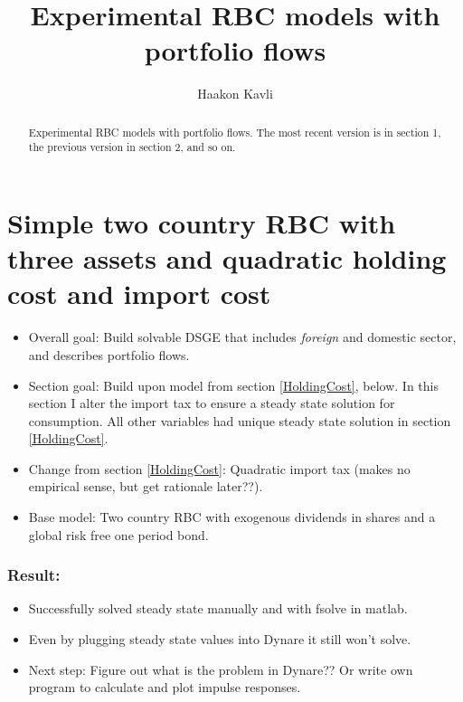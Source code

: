 \documentclass[a4paper]{article}
\begin{document}
\title{Experimental RBC models with portfolio flows}
\author{Haakon Kavli}
\maketitle
\begin{abstract}
Experimental RBC models with portfolio flows. The most recent version is in section 1, the previous version in section 2, and so on. 
\end{abstract}



\section{Simple two country RBC with three assets and quadratic holding cost and import cost}\label{SquareTax}
\begin{itemize}
\item Overall goal: Build  solvable DSGE that includes \emph{foreign} and domestic sector, and describes portfolio flows. 
\item Section goal: Build upon model from section \ref{HoldingCost}, below. In this section I alter the import tax to ensure a steady state solution for consumption. All other variables had unique steady state solution in section \ref{HoldingCost}.
\item Change from section \ref{HoldingCost}: Quadratic import tax (makes no empirical sense, but get rationale later??). 
\item Base model: Two country RBC with exogenous dividends in shares and a global risk free one period bond.
\end{itemize}

\subsubsection{Result:}
\begin{itemize}
\item Successfully solved steady state manually and with fsolve in matlab. 
\item Even by plugging steady state values into Dynare it still won't solve. 
\item Next step: Figure out what is the problem in Dynare?? Or write own program to calculate and plot impulse responses. 
\end{itemize}
\end{document}
